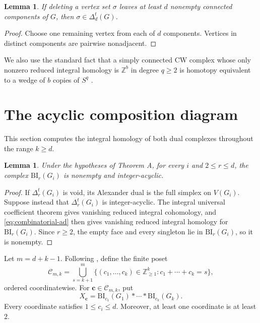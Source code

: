 \documentclass[11pt]{article}
\newtheorem{lemma}[theorem]{Lemma}
\theoremstyle{remark}
\numberwithin{equation}{section}
\begin{document}
\begin{lemma}\label{lem:remaining-components}
If deleting a vertex set $\sigma$ leaves at least $d$ nonempty connected
components of $G$, then $\sigma\in\Delta_d^t(G)$.
\end{lemma}

\begin{proof}
Choose one remaining vertex from each of $d$ components. Vertices in distinct
components are pairwise nonadjacent.
\end{proof}

We also use the standard fact that a simply connected CW complex whose only
nonzero reduced integral homology is $\mathbb Z^b$ in degree $q\geq2$ is
homotopy equivalent to a wedge of $b$ copies of $S^q$ \cite{ref4}.

\section{The acyclic composition diagram}\label{sec:composition}

This section computes the integral homology of both dual complexes throughout
the range $k\geq d$.

\begin{lemma}\label{lem:component-bi-acyclic}
Under the hypotheses of Theorem A, for every $i$ and $2\leq r\leq d$, the
complex $\mathrm{BI}_r(G_i)$ is nonempty and integer-acyclic.
\end{lemma}

\begin{proof}
If $\Delta_r^t(G_i)$ is void, its Alexander dual is the full simplex on
$V(G_i)$. Suppose instead that $\Delta_r^t(G_i)$ is integer-acyclic. The
integral universal coefficient theorem gives vanishing reduced integral
cohomology, and \eqref{eq:combinatorial-ad} then gives vanishing reduced
integral homology for $\mathrm{BI}_r(G_i)$. Since $r\geq2$, the empty face and
every singleton lie in $\mathrm{BI}_r(G_i)$, so it is nonempty.
\end{proof}

Let $m=d+k-1$. Following \cite{ref2}, define the finite poset
\begin{equation}
\mathcal C_{m,k}
=\bigcup_{s=k+1}^{m}
\{(c_1,\ldots,c_k)\in\mathbb Z_{\geq1}^k:
c_1+\cdots+c_k=s\},
\label{eq:composition-poset}
\end{equation}
ordered coordinatewise. For $\mathbf c\in\mathcal C_{m,k}$, put
\begin{equation}
X_{\mathbf c}
=\mathrm{BI}_{c_1}(G_1)*\cdots*\mathrm{BI}_{c_k}(G_k).
\label{eq:composition-object}
\end{equation}
Every coordinate satisfies $1\leq c_i\leq d$. Moreover, at least one
coordinate is at least $2$.
\end{document}
